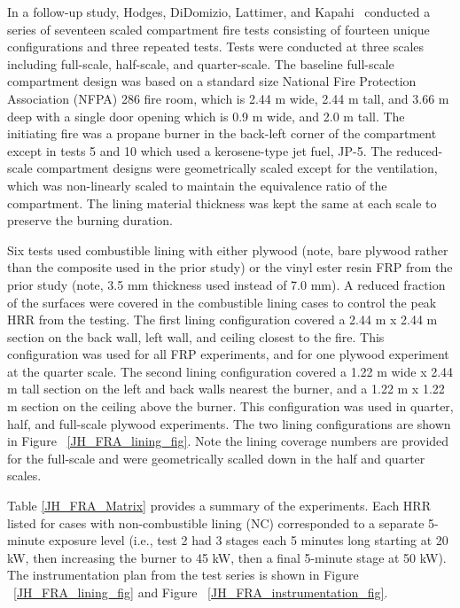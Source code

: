 In a follow-up study, Hodges, DiDomizio, Lattimer, and Kapahi~\cite{Hodges:FRA22} conducted a series of seventeen scaled compartment fire tests consisting of fourteen unique configurations and three repeated tests.
Tests were conducted at three scales including full-scale, half-scale, and quarter-scale. 
The baseline full-scale compartment design was based on a standard size National Fire Protection Association (NFPA) 286 fire room, which is 2.44 m wide, 2.44 m tall, and 3.66 m deep with a single door opening which is 0.9 m wide, and 2.0 m tall.
The initiating fire was a propane burner in the back-left corner of the compartment except in tests 5 and 10 which used a kerosene-type jet fuel, JP-5.
The reduced-scale compartment designs were geometrically scaled except for the ventilation, which was non-linearly scaled to maintain the equivalence ratio of the compartment. 
The lining material thickness was kept the same at each scale to preserve the burning duration.

Six tests used combustible lining with either plywood (note, bare plywood rather than the composite used in the prior study) or the vinyl ester resin FRP from the prior study (note, 3.5 mm thickness used instead of 7.0 mm).
A reduced fraction of the surfaces were covered in the combustible lining cases to control the peak HRR from the testing.
The first lining configuration covered a 2.44 m x 2.44 m section on the back wall, left wall, and ceiling closest to the fire.
This configuration was used for all FRP experiments, and for one plywood experiment at the quarter scale.
The second lining configuration covered a 1.22 m wide x 2.44 m tall section on the left and back walls nearest the burner, and a 1.22 m x 1.22 m section on the ceiling above the burner.
This configuration was used in quarter, half, and full-scale plywood experiments.
The two lining configurations are shown in Figure ~\ref{JH_FRA_lining_fig}.
Note the lining coverage numbers are provided for the full-scale and were geometrically scalled down in the half and quarter scales.

Table \ref{JH_FRA_Matrix} provides a summary of the experiments. 
Each HRR listed for cases with non-combustible lining (NC) corresponded to a separate 5-minute exposure level (i.e., test 2 had 3 stages each 5 minutes long starting at 20 kW, then increasing the burner to 45 kW, then a final 5-minute stage at 50 kW).
The instrumentation plan from the test series is shown in Figure ~\ref{JH_FRA_lining_fig} and Figure ~\ref{JH_FRA_instrumentation_fig}. 

